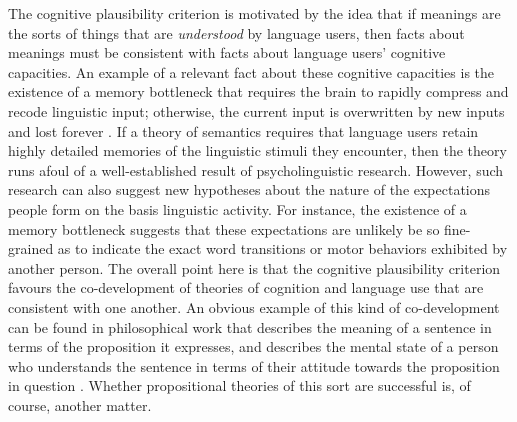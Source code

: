 The cognitive plausibility criterion is motivated by the idea that if meanings are the sorts of things that are \textit{understood} by language users, then facts about meanings must be consistent with facts about language users' cognitive capacities. An example of a relevant fact about these cognitive capacities is the existence of a memory bottleneck that requires the brain to rapidly compress and recode linguistic input; otherwise, the current input is overwritten by new inputs and lost forever \citep{Christiansen:2015}. If a theory of semantics requires that language users retain highly detailed memories of the linguistic stimuli they encounter, then the theory runs afoul of a well-established result of psycholinguistic research. However, such research can also suggest new hypotheses about the nature of the expectations people form on the basis linguistic activity. For instance, the existence of a memory bottleneck suggests that these expectations are unlikely be so fine-grained as to indicate the exact word transitions or motor behaviors exhibited by another person. The overall point here is that the cognitive plausibility criterion favours the co-development of theories of cognition and language use that are consistent with one another. An obvious example of this kind of co-development can be found in philosophical work that describes the meaning of a sentence in terms of the proposition it expresses, and describes the mental state of a person who understands the sentence in terms of their attitude towards the proposition in question \citep[][Ch. 5]{Dennett:1987}. Whether propositional theories of this sort are successful is, of course, another matter.

